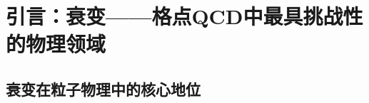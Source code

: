 \documentclass[12pt,a4paper]{ctexart}
\theoremstyle{definition}
\begin{document}
\begin{abstract}
\textbf{第四层——弱衰变与有效Hamiltonian（§5）：}
从电弱标准模型出发，W玻色子和Z玻色子交换在低能标下被积掉，产生\textbf{有效弱Hamiltonian}：
\begin{equation*}
H_{\text{eff}} = \frac{G_F}{\sqrt{2}} \sum_i V_{\text{CKM}}^i \, C_i(\mu) \, Q_i(\mu).
\end{equation*}
详述格点QCD在计算四夸克算符$Q_i$的强子矩阵元中的作用。讨论$K\to\pi\pi$衰变的两个核心挑战：紫外问题（算符的重整化和混合）和红外问题（Maiani--Testa定理——欧几里得关联函数在大体积极限下由零动量态主导，无法直接给出衰变振幅）。阐述Lellouch--L\"uscher关系如何克服这一困难——将有限体积中的$K\to\pi\pi$矩阵元与无穷大体积中的物理衰变振幅联系起来。

\textbf{第五层——CKM矩阵元与味物理（§6）：}
阐述格点QCD如何通过计算以下四类矩阵元来约束CKM幺正三角形的六个参数：
(i) \textbf{轻子衰变常数}：$f_{D_{(s)}}, f_{B_{(s)}}, f_K, f_\pi$——$|V_{cd}|, |V_{cs}|, |V_{ub}|$的直接测量；
(ii) \textbf{半轻子形状因子}：$B\to\pi\ell\nu, B\to D^{(*)}\ell\nu$——$|V_{ub}|, |V_{cb}|$的精确确定；
(iii) \textbf{$K$介子混合}：$B_K$参数——对幺正三角形的$\bar\rho\text{--}\bar\eta$平面提供强约束；
(iv) \textbf{$K\to\pi\pi$和$\epsilon'/\epsilon$}——CP破坏的直接与间接测量。

\textbf{第六层——粲介子衰变常数的现代精度（§7）：}
以本库中的粲介子衰变常数计算~\cite{CharmedClover}为具体实例，展示在13个$N_f=2+1$味系综、5个格距（$a\in[0.04,0.105]$~fm）上的连续极限计算。涵盖$D, D_s, D^*, D_s^*$的赝标量和矢量衰变常数、P波粲偶素的衰变常数、以及纯轻子衰变$D_{(s)}^*\to\ell\nu_\ell$的实验测试预言。

全篇以``从简单的两点函数提取衰变常数，到复杂的L\"uscher有限体积散射理论，再到标准模型味物理的完整CKM约束''为逻辑主线，系统展示了格点QCD如何成为弱衰变物理和味物理中不可替代的第一性原理理论工具。
\end{abstract}

\tableofcontents
\newpage

\section{引言：衰变——格点QCD中最具挑战性的物理领域}

\subsection{衰变在粒子物理中的核心地位}
\end{document}
